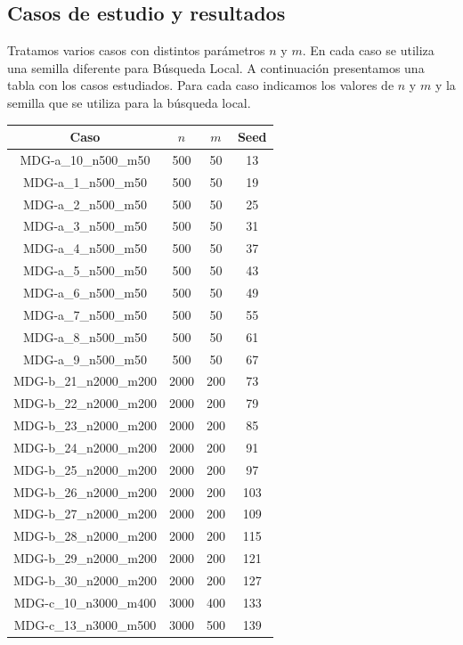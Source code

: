 \documentclass{article}
\begin{document}
\subsection{Casos de estudio y resultados}

Tratamos varios casos con distintos parámetros $n$ y $m$. En cada caso se utiliza una semilla diferente para Búsqueda Local.
A continuación presentamos una tabla con los casos estudiados. Para cada caso indicamos los valores de $n$ y $m$ y la semilla
que se utiliza para la búsqueda local.

\begin{table}[H]
	\centering
	\begin{tabular}{|cccc|}
		\hline
		Caso & $n$ & $m$ & Seed\\ \hline
		MDG-a\_10\_n500\_m50 & 500 & 50 & 13\\
		MDG-a\_1\_n500\_m50 & 500 & 50 & 19\\
		MDG-a\_2\_n500\_m50 & 500 & 50 & 25\\
		MDG-a\_3\_n500\_m50 & 500 & 50 & 31\\
		MDG-a\_4\_n500\_m50 & 500 & 50 & 37\\
		MDG-a\_5\_n500\_m50 & 500 & 50 & 43\\
		MDG-a\_6\_n500\_m50 & 500 & 50 & 49\\
		MDG-a\_7\_n500\_m50 & 500 & 50 & 55\\
		MDG-a\_8\_n500\_m50 & 500 & 50 & 61\\
		MDG-a\_9\_n500\_m50 & 500 & 50 & 67\\
		MDG-b\_21\_n2000\_m200 & 2000 & 200 & 73\\
		MDG-b\_22\_n2000\_m200 & 2000 & 200 & 79\\
		MDG-b\_23\_n2000\_m200 & 2000 & 200 & 85\\
		MDG-b\_24\_n2000\_m200 & 2000 & 200 & 91\\
		MDG-b\_25\_n2000\_m200 & 2000 & 200 & 97\\
		MDG-b\_26\_n2000\_m200 & 2000 & 200 & 103\\
		MDG-b\_27\_n2000\_m200 & 2000 & 200 & 109\\
		MDG-b\_28\_n2000\_m200 & 2000 & 200 & 115\\
		MDG-b\_29\_n2000\_m200 & 2000 & 200 & 121\\
		MDG-b\_30\_n2000\_m200 & 2000 & 200 & 127\\
		MDG-c\_10\_n3000\_m400 & 3000 & 400 & 133\\
		MDG-c\_13\_n3000\_m500 & 3000 & 500 & 139\\

\end{tabular}
\end{table}
\end{document}
